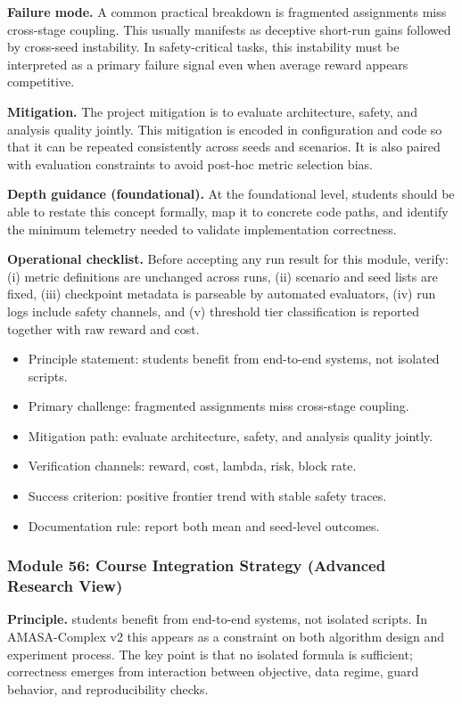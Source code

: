 \documentclass[conference]{IEEEtran}
\begin{document}
\textbf{Failure mode.} A common practical breakdown is fragmented assignments miss cross-stage coupling. This usually manifests as deceptive short-run gains followed by cross-seed instability. In safety-critical tasks, this instability must be interpreted as a primary failure signal even when average reward appears competitive.

\textbf{Mitigation.} The project mitigation is to evaluate architecture, safety, and analysis quality jointly. This mitigation is encoded in configuration and code so that it can be repeated consistently across seeds and scenarios. It is also paired with evaluation constraints to avoid post-hoc metric selection bias.

\textbf{Depth guidance (foundational).} At the foundational level, students should be able to restate this concept formally, map it to concrete code paths, and identify the minimum telemetry needed to validate implementation correctness.

\textbf{Operational checklist.} Before accepting any run result for this module, verify: (i) metric definitions are unchanged across runs, (ii) scenario and seed lists are fixed, (iii) checkpoint metadata is parseable by automated evaluators, (iv) run logs include safety channels, and (v) threshold tier classification is reported together with raw reward and cost.

\begin{itemize}[leftmargin=*]
  \item Principle statement: students benefit from end-to-end systems, not isolated scripts.
  \item Primary challenge: fragmented assignments miss cross-stage coupling.
  \item Mitigation path: evaluate architecture, safety, and analysis quality jointly.
  \item Verification channels: reward, cost, lambda, risk, block rate.
  \item Success criterion: positive frontier trend with stable safety traces.
  \item Documentation rule: report both mean and seed-level outcomes.
\end{itemize}


\subsubsection{Module 56: Course Integration Strategy (Advanced Research View)}
\textbf{Principle.} students benefit from end-to-end systems, not isolated scripts. In AMASA-Complex v2 this appears as a constraint on both algorithm design and experiment process. The key point is that no isolated formula is sufficient; correctness emerges from interaction between objective, data regime, guard behavior, and reproducibility checks.
\end{document}
